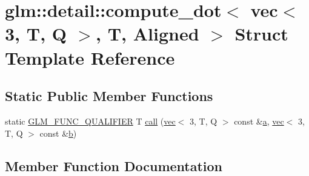 \hypertarget{structglm_1_1detail_1_1compute__dot_3_01vec_3_013_00_01_t_00_01_q_01_4_00_01_t_00_01_aligned_01_4}{}\section{glm\+:\+:detail\+:\+:compute\+\_\+dot$<$ vec$<$ 3, T, Q $>$, T, Aligned $>$ Struct Template Reference}
\label{structglm_1_1detail_1_1compute__dot_3_01vec_3_013_00_01_t_00_01_q_01_4_00_01_t_00_01_aligned_01_4}
\subsection*{Static Public Member Functions}
\begin{DoxyCompactItemize}
\item 
static \hyperlink{setup_8hpp_a33fdea6f91c5f834105f7415e2a64407}{G\+L\+M\+\_\+\+F\+U\+N\+C\+\_\+\+Q\+U\+A\+L\+I\+F\+I\+ER} T \hyperlink{structglm_1_1detail_1_1compute__dot_3_01vec_3_013_00_01_t_00_01_q_01_4_00_01_t_00_01_aligned_01_4_a1fb8b9e9e28e67f92f0288e723f73248}{call} (\hyperlink{structglm_1_1vec}{vec}$<$ 3, T, Q $>$ const \&\hyperlink{_s_d_l__opengl__glext_8h_a3309789fc188587d666cda5ece79cf82}{a}, \hyperlink{structglm_1_1vec}{vec}$<$ 3, T, Q $>$ const \&\hyperlink{_s_d_l__opengl__glext_8h_a0f71581a41fd2264c8944126dabbd010}{b})
\end{DoxyCompactItemize}


\subsection{Member Function Documentation}
\mbox{\label{structglm_1_1detail_1_1compute__dot_3_01vec_3_013_00_01_t_00_01_q_01_4_00_01_t_00_01_aligned_01_4_a1fb8b9e9e28e67f92f0288e723f73248}} 
